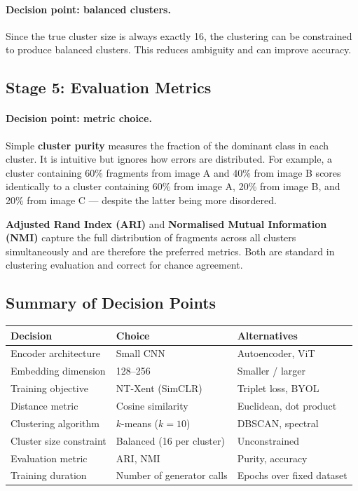 \documentclass[12pt, a4paper]{article}
\begin{document}
\paragraph{Decision point: balanced clusters.}
Since the true cluster size is always exactly 16, the clustering can be constrained to
produce balanced clusters. This reduces ambiguity and can improve accuracy.

\subsection{Stage 5: Evaluation Metrics}

\paragraph{Decision point: metric choice.}
Simple \textbf{cluster purity} measures the fraction of the dominant class in each
cluster. It is intuitive but ignores how errors are distributed. For example, a cluster
containing 60\% fragments from image A and 40\% from image B scores identically to a
cluster containing 60\% from image A, 20\% from image B, and 20\% from image C —
despite the latter being more disordered.

\textbf{Adjusted Rand Index (ARI)} and \textbf{Normalised Mutual Information (NMI)}
capture the full distribution of fragments across all clusters simultaneously and are
therefore the preferred metrics. Both are standard in clustering evaluation and correct
for chance agreement.

\subsection{Summary of Decision Points}

\begin{center}
\begin{tabular}{lll}
\toprule
\textbf{Decision} & \textbf{Choice} & \textbf{Alternatives} \\
\midrule
Encoder architecture & Small CNN & Autoencoder, ViT \\
Embedding dimension & 128--256 & Smaller / larger \\
Training objective & NT-Xent (SimCLR) & Triplet loss, BYOL \\
Distance metric & Cosine similarity & Euclidean, dot product \\
Clustering algorithm & $k$-means ($k=10$) & DBSCAN, spectral \\
Cluster size constraint & Balanced (16 per cluster) & Unconstrained \\
Evaluation metric & ARI, NMI & Purity, accuracy \\
Training duration & Number of generator calls & Epochs over fixed dataset \\
\bottomrule
\end{tabular}
\end{center}
\end{document}
